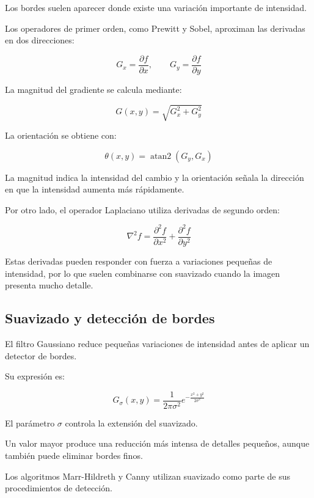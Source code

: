 \documentclass[11pt,letterpaper]{article}
\begin{document}
Los bordes suelen aparecer donde existe
una variación importante de intensidad.

Los operadores de primer orden,
como Prewitt y Sobel, aproximan
las derivadas en dos direcciones:

\[
G_x=\frac{\partial f}{\partial x},
\qquad
G_y=\frac{\partial f}{\partial y}
\]

La magnitud del gradiente se calcula mediante:

\begin{equation}
G(x,y)=\sqrt{G_x^2+G_y^2}
\end{equation}

La orientación se obtiene con:

\begin{equation}
\theta(x,y)=
\operatorname{atan2}(G_y,G_x)
\end{equation}

La magnitud indica la intensidad del cambio
y la orientación señala la dirección
en que la intensidad aumenta más rápidamente.

Por otro lado, el operador Laplaciano
utiliza derivadas de segundo orden:

\begin{equation}
\nabla^2f=
\frac{\partial^2 f}{\partial x^2}
+
\frac{\partial^2 f}{\partial y^2}
\end{equation}

Estas derivadas pueden responder con fuerza
a variaciones pequeñas de intensidad,
por lo que suelen combinarse con suavizado
cuando la imagen presenta mucho detalle.

\subsection{Suavizado y detección de bordes}

El filtro Gaussiano reduce pequeñas
variaciones de intensidad antes de aplicar
un detector de bordes.

Su expresión es:

\begin{equation}
G_\sigma(x,y)=
\frac{1}{2\pi\sigma^2}
e^{-\frac{x^2+y^2}{2\sigma^2}}
\end{equation}

El parámetro $\sigma$ controla
la extensión del suavizado.

Un valor mayor produce una reducción
más intensa de detalles pequeños,
aunque también puede eliminar bordes finos.

Los algoritmos Marr-Hildreth y Canny
utilizan suavizado como parte
de sus procedimientos de detección.
\end{document}
